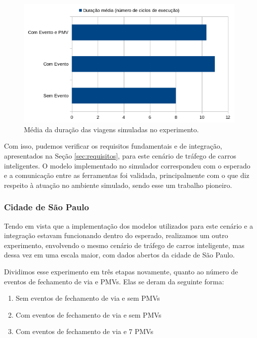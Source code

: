 \begin{figure}[ht]
	\centering
	\includegraphics[width=\textwidth]{figuras/duracao_validacao.png}
	\caption{Média da duração das viagens simuladas no experimento.}
	\label{fig:duracao_validacao}
\end{figure}

Com isso, pudemos verificar os requisitos fundamentais e de integração, apresentados na Seção \ref{sec:requisitos}, para este cenário de tráfego de carros inteligentes.
O modelo implementado no simulador correspondeu com o esperado e a comunicação entre as ferramentas foi validada, principalmente com o que diz respeito à atuação no ambiente simulado, sendo esse um
trabalho pioneiro.

\subsubsection{Cidade de São Paulo}
\label{sec:smart_traffic}

Tendo em vista que a implementação dos modelos utilizados para este cenário e a integração estavam funcionando dentro do esperado, realizamos um outro experimento, envolvendo o mesmo cenário de tráfego de
carros inteligente, mas dessa vez em uma escala maior, com dados abertos da cidade de São Paulo.

Dividimos esse experimento em três etapas novamente, quanto ao número de eventos de fechamento de via e PMVs. Elas se deram da seguinte forma:

\begin{enumerate}
    \item Sem eventos de fechamento de via e sem PMVs

    \item Com eventos de fechamento de via e sem PMVs

    \item Com eventos de fechamento de via e 7 PMVs
\end{enumerate}


